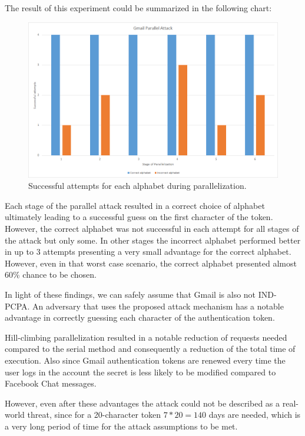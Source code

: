 The result of this experiment could be summarized in the following chart:

\begin{figure}[H] \caption{Successful attempts for each alphabet during parallelization.}
\includegraphics[width=1\textwidth]{diagrams/gmail_parallel.png}\end{figure}

Each stage of the parallel attack resulted in a correct choice of alphabet
ultimately leading to a successful guess on the first character of the token.
However, the correct alphabet was not successful in each attempt for all stages
of the attack but only some. In other stages the incorrect alphabet performed
better in up to 3 attempts presenting a very small advantage for the correct
alphabet. However, even in that worst case scenario, the correct alphabet
presented almost 60\% chance to be chosen.

In light of these findings, we can safely assume that Gmail is also not
IND-PCPA. An adversary that uses the proposed attack mechanism has a notable
advantage in correctly guessing each character of the authentication token.

Hill-climbing parallelization resulted in a notable reduction of requests
needed compared to the serial method and consequently a reduction of the
total time of execution. Also since Gmail authentication tokens are renewed
every time the user logs in the account the secret is less likely to be
modified compared to Facebook Chat messages.

However, even after these advantages the attack could not be described as a
real-world threat, since for a 20-character token \begin{math}7*20 =
140\end{math} days are needed, which is a very long period of time for the
attack assumptions to be met.
